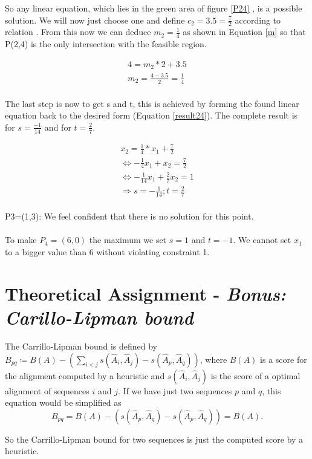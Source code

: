 \documentclass[%
   10pt,              %
   nenglish,           %
   a4paper,           %
   DIV11,             %
]{scrartcl}%
\begin{document}
 So any linear equation, which lies in the green area of figure \ref{P24} , is a possible solution. We will now just choose one and define $c_2 = 3.5 = \frac{7}{2}$ according to relation \label{rel2}. From this now we can deduce $m_2=\frac{1}{4}$ as shown in Equation \ref{m} so that P(2,4) is the only intersection with the feasible region.

\begin{eqnarray}
4=m_2 * 2+3.5\\
m_2 = \frac{4-3.5}{2}  = \frac{1}{4} \label{m}\\
\end{eqnarray}

The last step is now to get s and t, this is achieved by forming the found linear equation back to the desired form (Equation \ref{result24}). The complete result is for $s=\frac{-1}{14}$ and for $t= \frac{2}{7}$.

\begin{eqnarray}
x_2=\frac{1}{4} * x_1 + \frac{7}{2}\\
 	\Leftrightarrow 	- \frac{1}{4} x_1 + x_2=\frac{7}{2}\\
 	\Leftrightarrow 	- \frac{1}{14} x_1 + \frac{2}{7} x_2 = 1 \label{result24}\\
\Rightarrow s= - \frac{1}{14} ; t=\frac{2}{7}\\
\end{eqnarray}


\noindent P3=(1,3): We feel confident that there is no solution for this point.\\
\\
\noindent To make $P_4=(6,0)$ the maximum we set $s = 1$ and $t = -1$. We cannot set $x_1$ to a bigger value 
than 6 without violating constraint 1.


\section*{Theoretical Assignment - \textsl{Bonus: Carillo-Lipman bound}}

The Carrillo-Lipman bound is defined by $B_{pq} \coloneqq B(A) - (\sum_{i<j} s(\hat{A}_i, \hat{A}_j)-s(\hat{A}_p,\hat{A}_q))$, 
where $B(A)$ is a score for the alignment computed by a heuristic and $s(\hat{A}_i,\hat{A}_j)$ is 
the score of a optimal alignment of sequences $i$ and $j$. If we have just two sequences $p$ and $q$, 
this equation would be simplified as 
\[
B_{pq} = B(A) - (s(\hat{A}_p,\hat{A}_q)-s(\hat{A}_p,\hat{A}_q)) = B(A).
\]

\noindent So the Carrillo-Lipman bound for two sequences is just the computed score by a heuristic.
%
%
 
\end{document}
